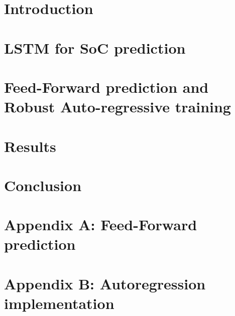 \documentclass[journal, onecolumn, draftclsnofoot]{IEEEtranTIE}
\begin{document}

\section{Introduction} \label{sec:Introduction}

\section{LSTM for SoC prediction} \label{sec:layer}

\section{Feed-Forward prediction and Robust Auto-regressive training} \label{sec:feed}

\section{Results} \label{sec:results}

\section{Conclusion} \label{sec:conclussion}





%
%
{
\clearpage
\appendices
\section{Appendix A: Feed-Forward prediction}  \label{app:Feed-Forward}

\clearpage
\section{Appendix B: Autoregression implementation}  \label{app:AutoFeedback}

}
{}
\end{document}
